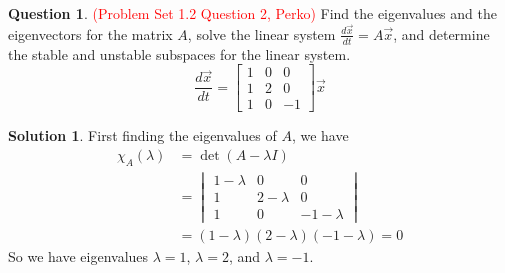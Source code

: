 \documentclass[11pt]{article}
\theoremstyle{definition}\newtheorem{definition}{Definition}
\theoremstyle{definition}\newtheorem{question}{Question}
\theoremstyle{definition}\newtheorem*{solution}{Solution}
\theoremstyle{definition}\newtheorem{example}{Example}
\theoremstyle{definition}\newtheorem{notation}{Notation}
\theoremstyle{theorem}\newtheorem{theorem}{Theorem}
\theoremstyle{theorem}\newtheorem{corollary}{Corollary}
\theoremstyle{theorem}\newtheorem{lemma}{Lemma}
\theoremstyle{theorem}\newtheorem{proposition}{Proposition}
\begin{document}
\begin{question}
    \textcolor{red}{(Problem Set 1.2 Question 2, Perko)} Find the eigenvalues and the eigenvectors for the matrix $A$, solve the linear system $\frac{d\vec{x}}{dt} = A\vec{x}$, and determine the stable and unstable subspaces for the linear system.
    \begin{equation*}
        \frac{d\vec{x}}{dt} = \begin{bmatrix} 1 & 0 & 0 \\ 1 & 2 & 0 \\ 1 & 0 & -1 \end{bmatrix} \vec{x}
    \end{equation*}
\end{question}

\begin{solution}
    First finding the eigenvalues of $A$, we have
    \begin{align*}
        \chi_A(\lambda) &= \det(A - \lambda I) \\
        &= \begin{vmatrix} 1 - \lambda & 0 & 0 \\ 1 & 2 - \lambda & 0 \\ 1 & 0 & -1 - \lambda \end{vmatrix} \\
        &= (1 - \lambda)(2 - \lambda)(-1 - \lambda) = 0
    \end{align*}
    So we have eigenvalues $\lambda = 1$, $\lambda = 2$, and $\lambda = -1$. 
    

\end{solution}
\end{document}
